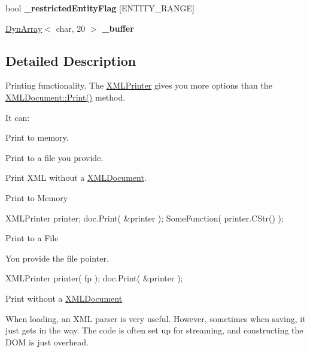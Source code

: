 \begin{DoxyCompactItemize}
\item 
\hypertarget{classtinyxml2_1_1_x_m_l_printer_a5df242509d42ae1c9128924121ebe093}{}bool {\bfseries \+\_\+restricted\+Entity\+Flag} \mbox{[}E\+N\+T\+I\+T\+Y\+\_\+\+R\+A\+N\+G\+E\mbox{]}\label{classtinyxml2_1_1_x_m_l_printer_a5df242509d42ae1c9128924121ebe093}

\item 
\hypertarget{classtinyxml2_1_1_x_m_l_printer_a19fca2e934576a892fefe2f602874d59}{}\hyperlink{classtinyxml2_1_1_dyn_array}{Dyn\+Array}$<$ char, 20 $>$ {\bfseries \+\_\+buffer}\label{classtinyxml2_1_1_x_m_l_printer_a19fca2e934576a892fefe2f602874d59}

\end{DoxyCompactItemize}


\subsection{Detailed Description}
Printing functionality. The \hyperlink{classtinyxml2_1_1_x_m_l_printer}{X\+M\+L\+Printer} gives you more options than the \hyperlink{classtinyxml2_1_1_x_m_l_document_a686ea28672c0e0c60383ec28148c1ac0}{X\+M\+L\+Document\+::\+Print()} method.

It can\+:
\begin{DoxyEnumerate}
\item Print to memory.
\item Print to a file you provide.
\item Print X\+M\+L without a \hyperlink{classtinyxml2_1_1_x_m_l_document}{X\+M\+L\+Document}.
\end{DoxyEnumerate}

Print to Memory

\begin{DoxyVerb}XMLPrinter printer;
doc.Print( &printer );
SomeFunction( printer.CStr() );
\end{DoxyVerb}


Print to a File

You provide the file pointer. \begin{DoxyVerb}XMLPrinter printer( fp );
doc.Print( &printer );
\end{DoxyVerb}


Print without a \hyperlink{classtinyxml2_1_1_x_m_l_document}{X\+M\+L\+Document}

When loading, an X\+M\+L parser is very useful. However, sometimes when saving, it just gets in the way. The code is often set up for streaming, and constructing the D\+O\+M is just overhead.

